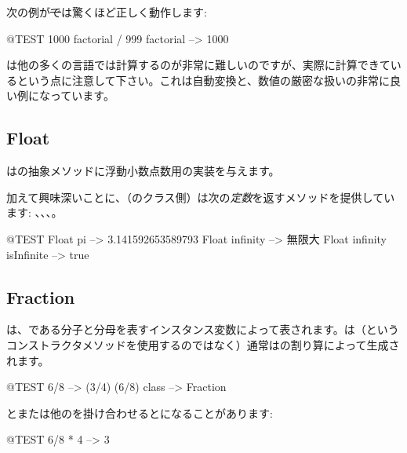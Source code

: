 \documentclass[a4paper,10pt,twoside]{book}
\begin{document}
次の例が\st では驚くほど正しく動作します:
\begin{code}{@TEST}
1000 factorial / 999 factorial --> 1000
\end{code}
は他の多くの言語では計算するのが非常に難しいのですが、実際に計算できているという点に注意して下さい。これは自動変換と、数値の厳密な扱いの非常に良い例になっています。


\subsection{Float}

はの抽象メソッドに浮動小数点数用の実装を与えます。

加えて興味深いことに、（\ie{}のクラス側）は次の\emph{定数}を返すメソッドを提供しています: 、、、。

\begin{code}{@TEST}
Float pi                      --> 3.141592653589793
Float infinity               --> 無限大
Float infinity isInfinite --> true
\end{code}

\subsection{Fraction}

は、である分子と分母を表すインスタンス変数によって表されます。は（というコンストラクタメソッドを使用するのではなく）通常はの割り算によって生成されます。

\begin{code}{@TEST}
6/8             --> (3/4)
(6/8) class --> Fraction
\end{code}

とまたは他のを掛け合わせるとになることがあります:

\begin{code}{@TEST}
6/8 * 4 --> 3
\end{code}
\end{document}
